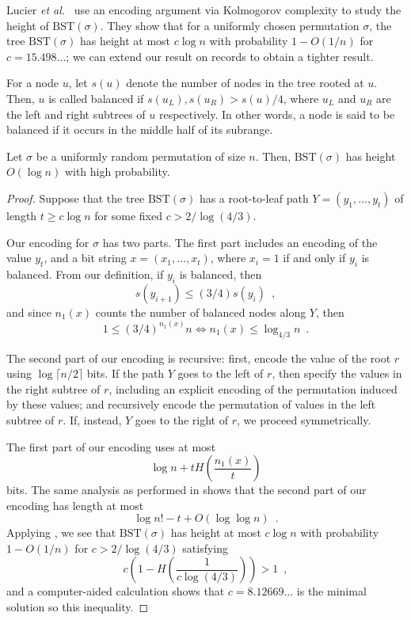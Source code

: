\documentclass{patmorin}
\begin{document}
Lucier \emph{et al.}~\cite{lucier.jiang.li:quicksort} use an encoding
argument via Kolmogorov complexity to study the height of
$\text{BST}(\sigma)$. They show that for a uniformly chosen
permutation $\sigma$, the tree $\text{BST}(\sigma)$ has height at most
$c \log n$ with probability $1 - O(1/n)$ for $c = 15.498...$; we can
extend our result on records to obtain a tighter result.

For a node $u$, let $s(u)$ denote the number of nodes in the tree
rooted at $u$. Then, $u$ is called balanced if
$s(u_L), s(u_R) > s(u)/4$, where $u_L$ and $u_R$ are the left and
right subtrees of $u$ respectively. In other words, a node is said to
be balanced if it occurs in the middle half of its subrange.

\begin{thm}
  Let $\sigma$ be a uniformly random permutation of size $n$. Then,
  $\text{BST}(\sigma)$ has height $O(\log n)$ with high probability.
\end{thm}
\begin{proof}
  Suppose that the tree $\text{BST}(\sigma)$ has a root-to-leaf path
  $Y = (y_1, \ldots, y_t)$ of length $t \geq c \log n$ for some fixed
  $c > 2/\log (4/3)$.

  Our encoding for $\sigma$ has two parts. The first part includes an
  encoding of the value $y_t$, and a bit string $x = (x_1, \ldots,
  x_t)$, where $x_i = 1$ if and only if $y_i$ is balanced. From our
  definition, if $y_i$ is balanced, then
  \[
  s(y_{i + 1}) \leq (3/4) s(y_i) \enspace ,
  \]
  and since $n_1(x)$ counts the number of balanced nodes along $Y$,
  then
  \[
  1 \leq (3/4)^{n_1(x)} n \iff n_1(x) \leq \log_{4/3} n \enspace .
  \]

  The second part of our encoding is recursive: first, encode the
  value of the root $r$ using $\log \lceil n/2 \rceil$ bits. If the
  path $Y$ goes to the left of $r$, then specify the values in the right subtree of $r$, including an explicit encoding
  of the permutation induced by these values; and recursively encode
  the permutation of values in the left subtree of $r$. If, instead,
  $Y$ goes to the right of $r$, we proceed symmetrically.
 
  The first part of our encoding uses at most
  \[
  \log n + t H\left(\frac{n_1(x)}{t}\right)
  \]
  bits. The same analysis as performed in  shows that
  the second part of our encoding has length at most
  \[
  \log n! - t + O(\log \log n) \enspace .
  \]
  Applying , we see that $\text{BST}(\sigma)$ has height
  at most $c \log n$ with probability $1 - O(1/n)$ for
  $c > 2/\log (4/3)$ satisfying
  \[
  c \left(1 - H\left(\frac{1}{c \log (4/3)}\right)\right) > 1 \enspace ,
  \]
  and a computer-aided calculation shows that $c = 8.12669...$ is the
  minimal solution so this inequality.
\end{proof}
\end{document}
